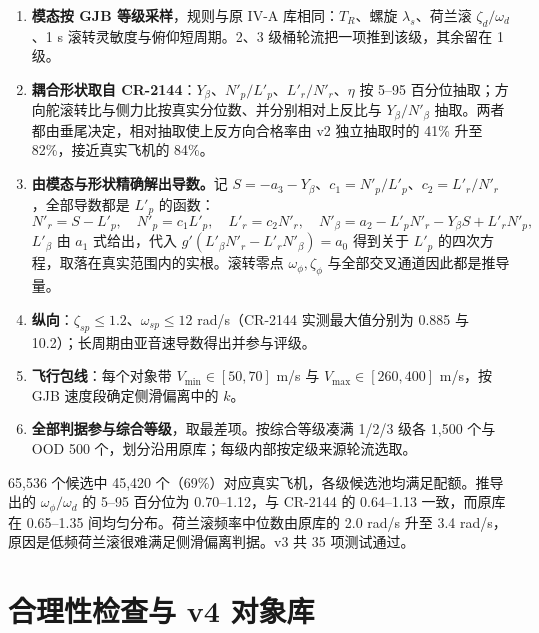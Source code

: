 \documentclass[UTF8,a4paper,11pt,fontset=fandol,scheme=plain]{ctexart}
\begin{document}
\begin{enumerate}[leftmargin=2em]
\item \textbf{模态按 GJB 等级采样}，规则与原 IV-A 库相同：\(T_R\)、螺旋 \(\lambda_s\)、荷兰滚 \(\zeta_d/\omega_d\)、1 s 滚转灵敏度与俯仰短周期。2、3 级桶轮流把一项推到该级，其余留在 1 级。
\item \textbf{耦合形状取自 CR-2144}：\(Y_\beta\)、\(N'_p/L'_p\)、\(L'_r/N'_r\)、\(\eta\) 按 5–95 百分位抽取；方向舵滚转比与侧力比按真实分位数、并分别相对上反比与 \(Y_\beta/N'_\beta\) 抽取。两者都由垂尾决定，相对抽取使上反方向合格率由 v2 独立抽取时的 41\% 升至 82\%，接近真实飞机的 84\%。
\item \textbf{由模态与形状精确解出导数。}记 \(S=-a_3-Y_\beta\)、\(c_1=N'_p/L'_p\)、\(c_2=L'_r/N'_r\)，全部导数都是 \(L'_p\) 的函数：
\begin{equation}
N'_r=S-L'_p,\quad N'_p=c_1L'_p,\quad L'_r=c_2N'_r,\quad N'_\beta=a_2-L'_pN'_r-Y_\beta S+L'_rN'_p,
\end{equation}
\(L'_\beta\) 由 \(a_1\) 式给出，代入 \(g'(L'_\beta N'_r-L'_rN'_\beta)=a_0\) 得到关于 \(L'_p\) 的四次方程，取落在真实范围内的实根。滚转零点 \(\omega_\phi,\zeta_\phi\) 与全部交叉通道因此都是推导量。
\item \textbf{纵向}：\(\zeta_{sp}\le1.2\)、\(\omega_{sp}\le12\) rad/s（CR-2144 实测最大值分别为 0.885 与 10.2）；长周期由亚音速导数得出并参与评级。
\item \textbf{飞行包线}：每个对象带 \(V_{\min}\in[50,70]\) m/s 与 \(V_{\max}\in[260,400]\) m/s，按 GJB 速度段确定侧滑偏离中的 \(k\)。
\item \textbf{全部判据参与综合等级}，取最差项。按综合等级凑满 1/2/3 级各 1,500 个与 OOD 500 个，划分沿用原库；每级内部按定级来源轮流选取。
\end{enumerate}

65,536 个候选中 45,420 个（69\%）对应真实飞机，各级候选池均满足配额。推导出的 \(\omega_\phi/\omega_d\) 的 5–95 百分位为 0.70–1.12，与 CR-2144 的 0.64–1.13 一致，而原库在 0.65–1.35 间均匀分布。荷兰滚频率中位数由原库的 2.0 rad/s 升至 3.4 rad/s，原因是低频荷兰滚很难满足侧滑偏离判据。v3 共 35 项测试通过。

\section{合理性检查与 v4 对象库}
\label{sec:v4}
\end{document}

